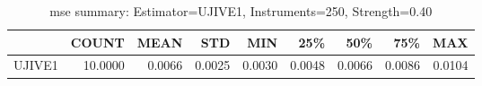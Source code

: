 \begin{table}[ht]
\centering
\caption{mse summary: Estimator=UJIVE1, Instruments=250, Strength=0.40}
\begin{tabular}{lrrrrrrrr}
\toprule
 & COUNT & MEAN & STD & MIN & 25\% & 50\% & 75\% & MAX \\
\midrule
UJIVE1 & 10.0000 & 0.0066 & 0.0025 & 0.0030 & 0.0048 & 0.0066 & 0.0086 & 0.0104 \\
\bottomrule
\end{tabular}
\end{table}
